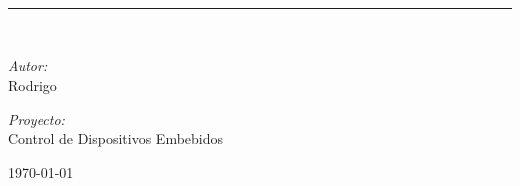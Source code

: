 \documentclass[
10pt, %
a4paper, %
oneside, %
headinclude,footinclude, %
BCOR5mm, %
]{scrartcl}
\begin{document}
\begin{titlepage}
	\centering
	\vspace*{2cm}
	
	
	\vspace{1cm}
	
	{\Huge\bfseries\color{Maroon}}\\[0.5cm]
	{\Huge\bfseries\color{Maroon}}\\[0.5cm]
	
	{\Large{}}\\[1.5cm]
	
	\rule{\linewidth}{1pt}\\[2cm]
	
	\begin{minipage}{0.45\textwidth}
		\begin{flushleft} \large
			\emph{Autor:}\\
			Rodrigo 
		\end{flushleft}
	\end{minipage}
	\hfill
	\begin{minipage}{0.45\textwidth}
		\begin{flushright} \large
			\emph{Proyecto:}\\
			Control de Dispositivos Embebidos
		\end{flushright}
	\end{minipage}
	
	\vfill
	\vspace{3cm}
	
	{\large\today}\\[1cm]
\end{titlepage}
\newpage %
\end{document}
